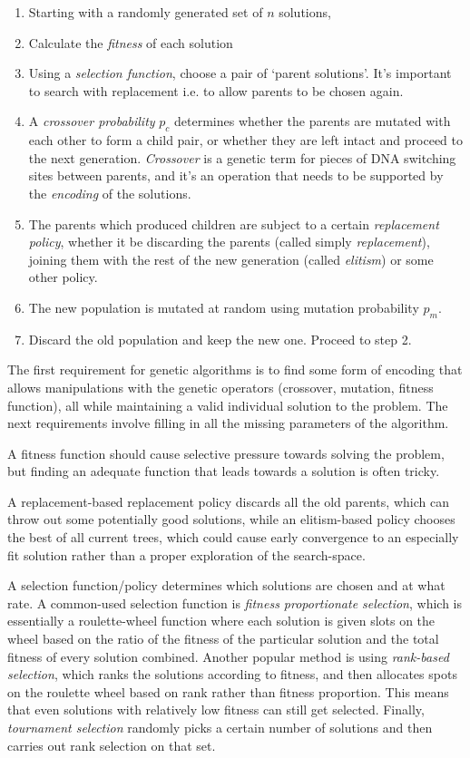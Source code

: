 \documentclass[12pt, letterpaper]{article}
\begin{document}
\begin{enumerate}
    \item Starting with a randomly generated set of $n$ solutions,
    \item Calculate the \emph{fitness} of each solution
    \item Using a \emph{selection function}, choose a pair of `parent solutions'. It's important to search with replacement i.e. to allow parents to be chosen again.
    \item A \emph{crossover probability} $p_c$ determines whether the parents are mutated with each other to form a child pair, or whether they are left intact and proceed to the next generation. \emph{Crossover} is a genetic term for pieces of DNA switching sites between parents, and it's an operation that needs to be supported by the \emph{encoding} of the solutions.
    \item The parents which produced children are subject to a certain \emph{replacement policy}, whether it be discarding the parents (called simply \emph{replacement}), joining them with the rest of the new generation (called \emph{elitism}) or some other policy.
    \item The new population is mutated at random using mutation probability $p_m$. 
    \item Discard the old population and keep the new one. Proceed to step 2.
\end{enumerate}

The first requirement for genetic algorithms is to find some form of encoding that allows manipulations with the genetic operators (crossover, mutation, fitness function), all while maintaining a valid individual solution to the problem. The next requirements involve filling in all the missing parameters of the algorithm. 

A fitness function should cause selective pressure towards solving the problem, but finding an adequate function that leads towards a solution is often tricky. 

A replacement-based replacement policy discards all the old parents, which can throw out some potentially good solutions, while an elitism-based policy chooses the best of all current trees, which could cause early convergence to an especially fit solution rather than a proper exploration of the search-space.

A selection function/policy determines which solutions are chosen and at what rate. A common-used selection function is \emph{fitness proportionate selection}, which is essentially a roulette-wheel function where each solution is given slots on the wheel based on the ratio of the fitness of the particular solution and the total fitness of every solution combined. Another popular method is using \emph{rank-based selection}, which ranks the solutions according to fitness, and then allocates spots on the roulette wheel based on rank rather than fitness proportion. This means that even solutions with relatively low fitness can still get selected. Finally, \emph{tournament selection} randomly picks a certain number of solutions and then carries out rank selection on that set.
\end{document}
